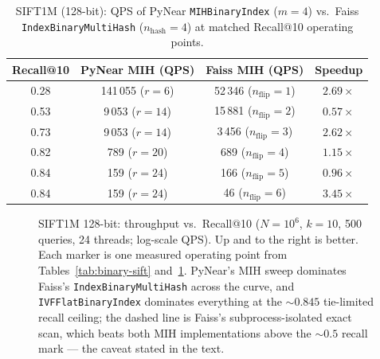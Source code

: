 \documentclass[11pt,a4paper]{article}
\begin{document}
\begin{table}[h]
\centering
\caption{SIFT1M (128-bit): QPS of PyNear \texttt{MIHBinaryIndex} ($m=4$)
  vs.\ Faiss \texttt{IndexBinaryMultiHash} ($n_{\mathrm{hash}}=4$) at
  matched Recall@10 operating points.}
\label{tab:mih-vs-faiss-mih}
\renewcommand{\arraystretch}{1.2}
\begin{tabular}{cccc}
\toprule
\textbf{Recall@10} & \textbf{PyNear MIH (QPS)} & \textbf{Faiss MIH (QPS)} & \textbf{Speedup} \\
\midrule
0.28 & 141\,055 ($r=6$)  & 52\,346 ($n_{\mathrm{flip}}=1$) & $2.69\times$ \\
0.53 & 9\,053 ($r=14$)   & 15\,881 ($n_{\mathrm{flip}}=2$) & $0.57\times$ \\
0.73 & 9\,053 ($r=14$)   & 3\,456 ($n_{\mathrm{flip}}=3$)  & $2.62\times$ \\
0.82 & 789 ($r=20$)      & 689 ($n_{\mathrm{flip}}=4$)     & $1.15\times$ \\
0.84 & 159 ($r=24$)      & 166 ($n_{\mathrm{flip}}=5$)     & $0.96\times$ \\
0.84 & 159 ($r=24$)      & 46 ($n_{\mathrm{flip}}=6$)      & $3.45\times$ \\
\bottomrule
\end{tabular}
\end{table}

\begin{figure}[h]
\centering
{}
\caption{SIFT1M 128-bit: throughput vs.\ Recall@10 ($N = 10^6$, $k = 10$,
  500 queries, 24 threads; log-scale QPS).  Up and to the right is better.
  Each marker is one measured operating point from
  Tables~\ref{tab:binary-sift} and~\ref{tab:mih-vs-faiss-mih}.  PyNear's
  MIH sweep dominates Faiss's \texttt{IndexBinaryMultiHash} across the
  curve, and \texttt{IVFFlatBinaryIndex} dominates everything at the
  ${\sim}0.845$ tie-limited recall ceiling; the dashed line is Faiss's
  subprocess-isolated exact scan, which beats both MIH implementations
  above the ${\sim}0.5$ recall mark — the caveat stated in the text.}
\label{fig:sift-pareto}
\end{figure}
\end{document}
